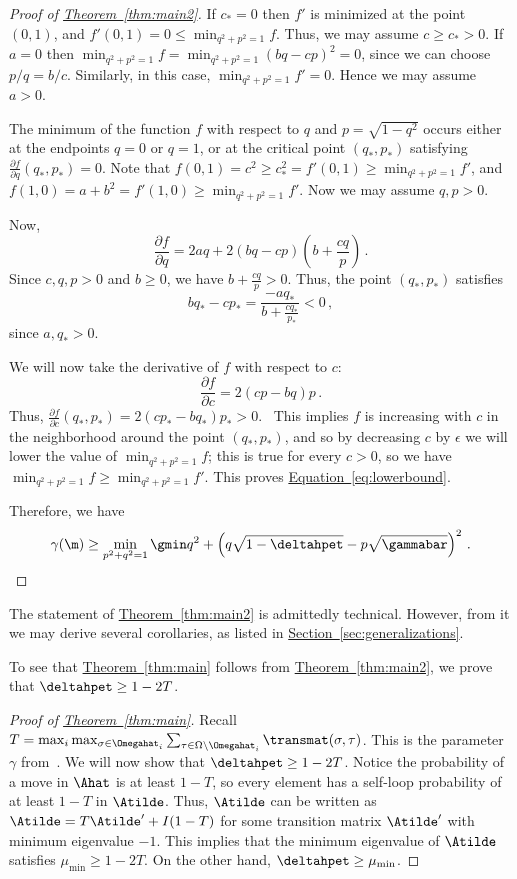 \documentclass[11pt]{article}
\providecommand{\expref}[2]{\texorpdfstring{\hyperref[#2]{#1~\ref{#2}}}{#1~\ref{#2}}}
\begin{document}
\begin{proof}[Proof of \expref{Theorem}{thm:main2}]
If $c_*=0$ then $f'$ is minimized at the point $(0,1)$, and $ f'(0,1)=0\leq  \min_{q^2+p^2=1} f$.  Thus, we may assume $c\geq c_*>0$.  If $a=0$ then $\min_{q^2+p^2=1} f =  \min_{q^2+p^2=1}(bq-cp)^2 = 0$, since we can choose $p/q = b/c$.  Similarly, in this case, $\min_{q^2+p^2=1} f'=0$.  Hence we may assume $a>0$.


The minimum of the function $f$ with respect to $q$ and $p=\sqrt{1-q^2}$ occurs either at the endpoints $q=0$ or $q=1$, or at the critical point $(q_*, p_*)$ satisfying $\frac{\partial f}{\partial q}(q_*,p_*)=0$.
Note that $f(0,1) = c^2\geq c_*^2=f'(0,1)\geq \min_{q^2+p^2=1} f'$, and $f(1,0) = a+b^2=f'(1,0)\geq \min_{q^2+p^2=1} f'$.  
Now we may assume $q, p>0$.   

Now,
\[\frac{\partial f}{\partial q}  = 2aq + 2(bq-cp)\left(b+\frac{cq}{p}\right)\,.\]
Since $c,q,p>0$ and $b\geq 0$, we have $b+\frac{cq}{p}>0$.  Thus, the point $(q_*,p_*)$  satisfies
\[bq_*-cp_* = \frac{-aq_*}{b+\frac{cq_*}{p_*}}< 0\,,\]
since $a,q_*>0$.  



%
We will now take the derivative of $f$ with respect to $c$:
\[\frac{\partial f}{\partial c}  = 2(cp-bq)p\,.\]
Thus, $\frac{\partial f}{\partial c}(q_*,p_*) = 2(cp_*-bq_*)p_* >0$.  This implies $f$ is increasing with $c$ in the neighborhood around the point $(q_*, p_*)$, and so by decreasing $c$ by $\epsilon$ we will lower the value of $\min_{q^2+p^2=1} f$; this is true for every $c>0$, so we have $\min_{q^2+p^2=1} f \geq \min_{q^2+p^2=1} f'$.  This proves \expref{Equation}{eq:lowerbound}.
%
%


Therefore, we have
\[\gamma(\m) \geq  \min_{p^2+q^2=1}\gmin q^2+\left(q\sqrt{1-\deltahpet} - p\sqrt{\gammabar}\right)^2\,.\qedhere\]
\end{proof}
%

The statement of \expref{Theorem}{thm:main2} is admittedly technical.
However, from it we may derive several corollaries, as listed in \expref{Section}{sec:generalizations}. 

To see that \expref{Theorem}{thm:main} follows from
\expref{Theorem}{thm:main2}, we prove that $\deltahpet\geq 1-2T$.

%
%
%
\begin{proof}[Proof of \expref{Theorem}{thm:main}]
Recall $T = 
\max_i\max_{\sigma\in\Omegahat_i}\sum_{\tau\in\Omega\setminus\Omegahat_i}\transmat(\sigma,\tau)$.  
This is the parameter $\gamma$ from~\cite{jstv04}. We will now show that $\deltahpet\geq 1-2T$.
Notice the probability of a move in $\Ahat$ is at least 
$1-T$, so every element has a self-loop probability of at least $1-T$ 
in $\Atilde$. 
Thus, $\Atilde$ can be 
written as $\Atilde = T\Atilde' + I(1-T)$ for some transition matrix 
$\Atilde'$ with minimum eigenvalue $-1$.  This implies that the 
minimum eigenvalue of $\Atilde$ satisfies $\mu_{\min}\geq 1-2T$.  On 
the other hand, $\deltahpet\geq \mu_{\min}$. 
\end{proof}
%
\end{document}
